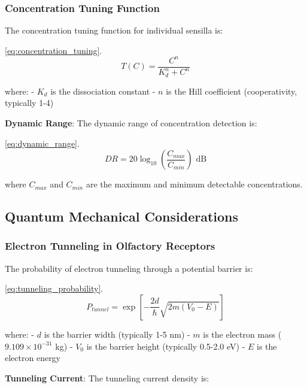 \documentclass[
  13pt,
  a4paperpaper,
  12pt]{article}
\begin{document}
\subsubsection{Concentration Tuning
Function}\label{concentration-tuning-function}

The concentration tuning function for individual sensilla is:

\eqref{eq:concentration_tuning}. \begin{equation}
T(C) = \frac{C^n}{K_d^n + C^n} \label{eq:concentration_tuning}
\end{equation}

where: - \(K_d\) is the dissociation constant - \(n\) is the Hill
coefficient (cooperativity, typically 1-4)

\textbf{Dynamic Range}: The dynamic range of concentration detection is:

\eqref{eq:dynamic_range}. \begin{equation}
DR = 20 \log_{10}\left(\frac{C_{max}}{C_{min}}\right) \text{ dB} \label{eq:dynamic_range}
\end{equation}

where \(C_{max}\) and \(C_{min}\) are the maximum and minimum detectable
concentrations.

\subsection{Quantum Mechanical
Considerations}\label{quantum-mechanical-considerations}

\subsubsection{Electron Tunneling in Olfactory
Receptors}\label{electron-tunneling-in-olfactory-receptors}

The probability of electron tunneling through a potential barrier is:

\eqref{eq:tunneling_probability}. \begin{equation}
P_{tunnel} = \exp\left[-\frac{2d}{\hbar} \sqrt{2m(V_0 - E)}\right] \label{eq:tunneling_probability}
\end{equation}

where: - \(d\) is the barrier width (typically 1-5 nm) - \(m\) is the
electron mass (\(9.109 \times 10^{-31}\) kg) - \(V_0\) is the barrier
height (typically 0.5-2.0 eV) - \(E\) is the electron energy

\textbf{Tunneling Current}: The tunneling current density is:
\end{document}
